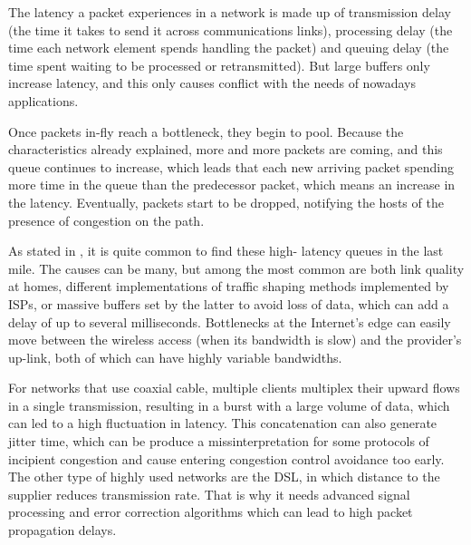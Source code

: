 The latency a packet experiences in a network is made up of transmission
delay (the time it takes to send it across communications links), processing
delay (the time each network element spends handling the packet) and queuing
delay (the time spent waiting to be processed or retransmitted). But large
buffers only increase latency, and this only causes conflict with the needs
of nowadays applications.

Once packets in-fly reach a bottleneck, they begin to pool. Because the
characteristics already explained, more and more packets are coming, and this
queue continues to increase, which leads that each new arriving packet spending
more time in the queue than the predecessor packet, which means an
increase in the latency. Eventually, packets start to be dropped,
notifying the hosts of the presence of congestion on the path.

As stated in \cite{Dischinger2007CRB}, it is quite common to find these high-
latency queues in the last mile. The causes can be many, but among the most
common are both link quality at homes, different implementations of traffic
shaping methods implemented by ISPs, or massive buffers set by the latter to
avoid loss of data, which can add a delay of up to several milliseconds.
Bottlenecks at the Internet's edge can easily move between the wireless
access (when its bandwidth is slow) and the provider's up-link, both of which
can have highly variable bandwidths.

For networks that use coaxial cable, multiple clients multiplex their
upward flows in a single transmission, resulting in a burst with a large
volume of data, which can led to a high fluctuation in latency. This
concatenation can also generate jitter time, which can be produce a missinterpretation for some protocols of incipient congestion and cause entering
congestion control avoidance too early. The other type of highly used
networks are the DSL, in which distance to the supplier reduces
transmission rate. That is why it needs advanced signal processing and
error correction algorithms which can lead to high packet propagation delays.
